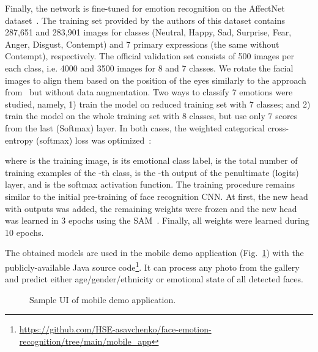 \documentclass[runningheads]{llncs}
\begin{document}
Finally, the network is fine-tuned for emotion recognition on the AffectNet dataset~\cite{mollahosseini2017affectnet}. The training set provided by the authors of this dataset contains 287,651 and 283,901 images for  classes (Neutral, Happy, Sad, Surprise, Fear, Anger, Disgust, Contempt) and 7 primary expressions (the same without Contempt), respectively. The official validation set consists of 500 images per each class, i.e. 4000 and 3500 images for 8 and 7 classes. We rotate the facial images to align them based on the position of the eyes similarly to the approach from~\cite{antoniadis2021exploiting} but without data augmentation. Two ways to classify 7 emotions were studied, namely, 1) train the model on reduced training set with 7 classes; and 2) train the model on the whole training set with 8 classes, but use only 7 scores from the last (Softmax) layer. In both cases, the weighted categorical cross-entropy (softmax) loss was optimized~\cite{mollahosseini2017affectnet}:

where  is the training image,  is its emotional class label,  is the total number of training examples of the -th class,  is the -th output of the penultimate (logits) layer, and  is the softmax activation function. The training procedure remains similar to the initial pre-training of face recognition CNN. At first, the new head with  outputs was added, the remaining weights were frozen and the new head was learned in 3 epochs using the SAM~\cite{foret2020sharpness}. Finally, all weights were learned during 10 epochs.

The obtained models are used in the mobile demo application (Fig.~\ref{fig:3}) with the publicly-available Java source code\footnote{\url{https://github.com/HSE-asavchenko/face-emotion-recognition/tree/main/mobile_app}}. It can process any photo from the gallery and predict either age/gender/ethnicity or emotional state of all detected faces.

\begin{figure}[t]
 \centering
{}
 \caption{Sample UI of mobile demo application.}
\label{fig:3}
\end{figure}
\end{document}
